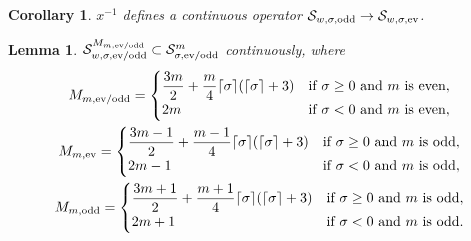 \documentclass[pdftex]{sigma}
\newtheorem{Corollary}[Theorem]{Corollary}
\newtheorem{Lemma}[Theorem]{Lemma}
\renewcommand{\SS}{\mathcal{S}}
\begin{document}
\begin{Corollary}\label{c:x^-1:SS_w,sigma,odd to SS_w,sigma,ev}
  $x^{-1}$ defines a continuous operator $\SS_{w,\sigma,\text{\rm odd}}\to\SS_{w,\sigma,\text{\rm ev}}$.
\end{Corollary}

\begin{Lemma}\label{l:SS_w,sigma^M_m subset SS_sigma^m}
  $\SS_{w,\sigma,\text{\rm ev/odd}}^{M_{m,\text{\rm ev/odd}}}\subset\SS_{\sigma,\text{\rm ev/odd}}^m$ continuously, where
    \begin{gather*}
      M_{m,\text{\rm ev/odd}} =
        \begin{cases}
          \dfrac{3m}{2}+\dfrac{m}{4} \lceil\sigma\rceil(\lceil\sigma\rceil+3) & \text{if $\sigma\ge0$ and $m$ is even},\\
          2m & \text{if $\sigma<0$ and $m$ is even} ,
        \end{cases}
      \\
      M_{m,\text{\rm ev}} =
        \begin{cases}
          \dfrac{3m-1}{2}+\dfrac{m-1}{4} \lceil\sigma\rceil(\lceil\sigma\rceil+3) & \text{if $\sigma\ge0$ and $m$ is odd},\\
          2m-1 & \text{if $\sigma<0$ and $m$ is odd} ,
        \end{cases}
      \\
      M_{m,\text{\rm odd}} =
        \begin{cases}
          \dfrac{3m+1}{2}+\dfrac{m+1}{4} \lceil\sigma\rceil(\lceil\sigma\rceil+3)
          & \text{if $\sigma\ge0$ and $m$ is odd},\\
          2m+1 & \text{if $\sigma<0$ and $m$ is odd} .
        \end{cases}
    \end{gather*}
\end{Lemma}
\end{document}
